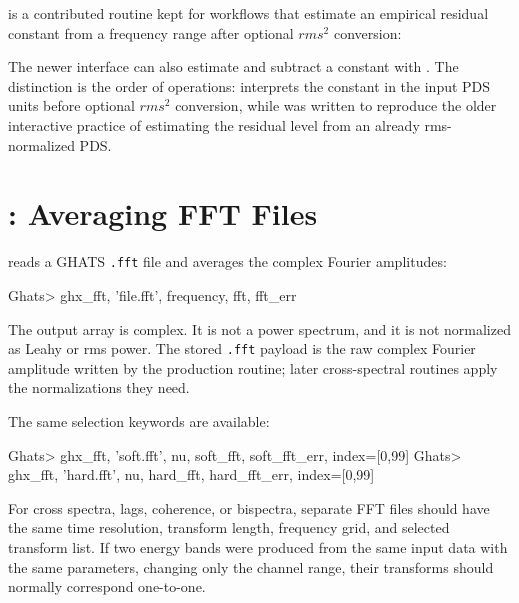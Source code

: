  is a contributed routine kept for workflows that
estimate an empirical residual constant from a frequency range after optional
\(rms^2\) conversion:


The newer  interface can also estimate and subtract a constant
with .  The distinction is the order of operations:
 interprets the constant in the input PDS units before optional
\(rms^2\) conversion, while  was written to reproduce
the older interactive practice of estimating the residual level from an
already rms-normalized PDS.

\section{: Averaging FFT Files}

 reads a GHATS \texttt{.fft} file and averages the complex
Fourier amplitudes:

\begin{ghatsconsole}
Ghats> ghx_fft, 'file.fft', frequency, fft, fft_err
\end{ghatsconsole}

The output  array is complex.  It is not a power spectrum, and it
is not normalized as Leahy or rms power.  The stored \texttt{.fft} payload is
the raw complex Fourier amplitude written by the production routine; later
cross-spectral routines apply the normalizations they need.

The same selection keywords are available:

\begin{ghatsconsole}
Ghats> ghx_fft, 'soft.fft', nu, soft_fft, soft_fft_err, index=[0,99]
Ghats> ghx_fft, 'hard.fft', nu, hard_fft, hard_fft_err, index=[0,99]
\end{ghatsconsole}

For cross spectra, lags, coherence, or bispectra, separate FFT files should
have the same time resolution, transform length, frequency grid, and selected
transform list.  If two energy bands were produced from the same input data
with the same parameters, changing only the channel range, their transforms
should normally correspond one-to-one.

